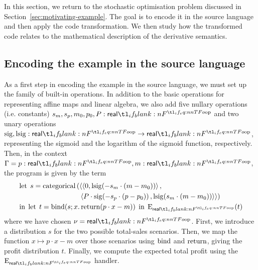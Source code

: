 \documentclass[11pt,a4paper]{article}
\theoremstyle{definition}
\theoremstyle{remark}
\begin{document}
In this section, we return to the stochastic optimisation problem discussed in Section~\ref{sec:motivating-example}. The goal is to encode it in the source language and then apply the code transformation. We then study how the transformed code relates to the mathematical description of the derivative semantics.

\subsection{Encoding the example in the source language}
\label{sec:encoding-the-example-in-the-source-language}

As a first step in encoding the example in the source language, we must set up the family of built-in operations. In addition to the basic operations for representing affine maps and linear algebra, we also add five nullary operations (i.e. constants) \( s_{m}, s_{p}, m_{0}, p_{0}, P : \srcreal \) and two unary operations \( \opn[b]{sig}, \opn[b]{lsig}: \srcreal \to \srcreal \), representing the sigmoid and the logarithm of the sigmoid function, respectively. Then, in the context \( \Gamma = p : \srcreal, m : \srcreal \), the program is given by the term
\begin{equation}
  \label{eq:example-source-code-encoding}
  \begin{aligned}
    &\opn[b]{let} \;
      s =
      \opn[b]{categorical}
      \left(
      \left \langle
      \tuple{ 0, \fn[n]{ \opn[b]{lsig} }{ -s_{m} \cdot \left( m - m_{0} \right) } },
      \right.
      \right.
    \\
    &\qquad \qquad \qquad \qquad \hphantom{a}
      \left.
      \left.
      \tuple{
      P \cdot \fn[n]{ \opn[b]{sig} }{ -s_{p} \cdot \left( p - p_{0} \right) },
      \fn[n]{ \opn[b]{lsig} }{ s_{m} \cdot \left( m - m_{0} \right) }
      }
      \right\rangle
      \right)
    \\
    &\opn[b]{in} \;
      \opn[b]{let} \;
      t = \fn[n]{ \opn[b]{bind} }{s; x . \fn[n]{ \opn[b]{return} }{ p \cdot x - m } }
      \; \opn[b]{in} \;
      \fn[n]{ \opn[b]{E}_{\srcreal} }{ t }
  \end{aligned}
\end{equation}
where we have chosen \( \nu = \srcreal \). First, we introduce a distribution \( s \) for the two possible total-sales scenarios. Then, we map the function \( x \mapsto p \cdot x - m \) over those scenarios using \( \opn[b]{bind} \) and \( \opn[b]{return} \), giving the profit distribution \( t \). Finally, we compute the expected total profit using the \( \opn[b]{E}_{\srcreal} \) handler.
\end{document}

